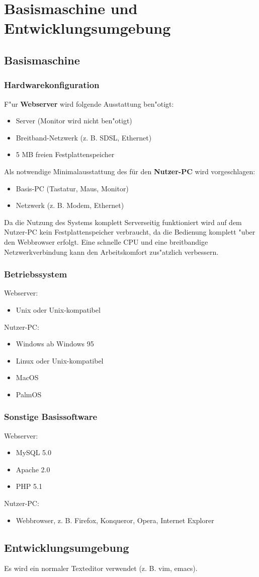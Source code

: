\chapter{Basismaschine und Entwicklungsumgebung}
\section{Basismaschine}
\subsection{Hardwarekonfiguration}
F"ur {\bf Webserver} wird folgende Ausstattung ben"otigt:
\begin{itemize}
 \item Server (Monitor wird nicht ben"otigt)
 \item Breitband-Netzwerk (z. B. SDSL, Ethernet)
 \item 5 MB freien Festplattenspeicher
\end{itemize}
Als notwendige Minimalausstattung des für den {\bf Nutzer-PC} wird vorgeschlagen:
\begin{itemize}
 \item Basis-PC (Tastatur, Maus, Monitor)
 \item Netzwerk (z. B. Modem, Ethernet)
\end{itemize}
Da die Nutzung des Systems komplett Serverseitig funktioniert wird auf dem Nutzer-PC kein Festplattenspeicher verbraucht, da die
Bedienung komplett "uber den Webbrowser erfolgt. Eine schnelle CPU und eine breitbandige Netzwerkverbindung
kann den Arbeitskomfort zus"atzlich verbessern.


\subsection{Betriebssystem}
Webserver:
\begin{itemize}
\item Unix oder Unix-kompatibel
\end{itemize}
Nutzer-PC:
\begin{itemize}
\item Windows ab Windows 95
\item Linux oder Unix-kompatibel
\item MacOS
\item PalmOS
\end{itemize}

\subsection{Sonstige Basissoftware}
Webserver:
\begin{itemize}
\item MySQL 5.0
\item Apache 2.0
\item PHP 5.1
\end{itemize}
Nutzer-PC:
\begin{itemize}
\item Webbrowser, z. B. Firefox, Konqueror, Opera, Internet Explorer
\end{itemize}


\section{Entwicklungsumgebung}
Es wird ein normaler Texteditor verwendet (z. B. vim, emacs).
